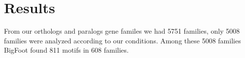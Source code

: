 \section{Results}

From our orthologs and paralogs gene familes we had 5751 families, only 5008 families were analyzed according to our conditions. Among these 5008 families BigFoot found 811 motifs in 608 families.